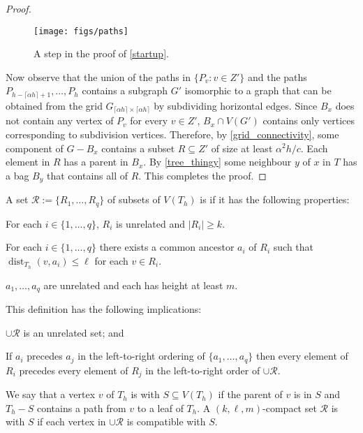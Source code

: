 \documentclass{patmorin}
\DeclareMathOperator{\dist}{dist}
\renewcommand{\le}{\leqslant}
\renewcommand{\ge}{\geqslant}
\begin{document}
\begin{proof}
  \begin{figure}
    \begin{center}
      \texttt{[image: figs/paths]}
    \end{center}
    \caption{A step in the proof of \cref{startup}.}
    \label{paths}
  \end{figure}

  Now observe that the union of the paths in  $\{P_{v}:v\in Z'\}$ and the paths $P_{h-\lceil\alpha h\rceil+1},\ldots,P_{h}$ contains a subgraph $G'$ isomorphic to a graph that can be obtained from the grid $G_{\lceil \alpha h\rceil\times\lceil \alpha h\rceil}$ by subdividing horizontal edges.  Since $B_x$ does not contain any vertex of $P_{v}$ for every $v\in Z'$,  $B_x\cap V(G')$ contains only vertices corresponding to subdivision vertices.  Therefore, by \cref{grid_connectivity}, some component of $G-B_x$ contains a subset $R\subseteq Z'$ of size at least $\alpha^2 h/c$.  Each element in $R$ has a parent in $B_x$.  By \cref{tree_thingy} some neighbour $y$ of $x$ in $T$ has a bag $B_y$ that contains all of $R$.  This completes the proof.
\end{proof}



A set $\mathcal{R}:=\{R_1,\ldots,R_q\}$ of subsets of $V(T_h)$ is  if it has the following properties:

\begin{compactenum}
  \item For each $i\in\{1,\ldots,q\}$, $R_i$ is unrelated and $|R_i|\ge k$.
  \item For each $i\in\{1,\ldots,q\}$ there exists a common ancestor $a_i$ of $R_i$ such that $\dist_{T_h}(v,a_i)\le\ell$ for each $v\in R_i$.
  \item $a_1,\ldots,a_q$ are unrelated and each has height at least $m$.
\end{compactenum}

This definition has the following implications:
\begin{inparaenum}[(i)]
  \item $\cup \mathcal{R}$ is an unrelated set; and
  \item If $a_i$ precedes $a_j$ in the left-to-right ordering of $\{a_1,\ldots,a_q\}$ then every element of $R_i$ precedes every element of $R_j$ in the left-to-right order of $\cup\mathcal{R}$.
\end{inparaenum}
We say that a vertex $v$ of $T_h$ is  with $S\subseteq V(T_h)$ if the parent of $v$ is in $S$ and $T_h-S$ contains a path from $v$ to a leaf of $T_h$.  A $(k,\ell,m)$-compact set $\mathcal{R}$ is  with $S$ if each vertex in $\cup\mathcal{R}$ is compatible with $S$.
\end{document}
